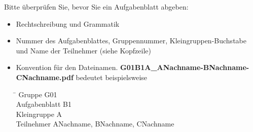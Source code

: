\documentclass[ngerman]{fbi-aufgabenblatt}
\begin{document}

Bitte überprüfen Sie, bevor Sie ein Aufgabenblatt abgeben:

\begin{itemize}
	\item Rechtschreibung und Grammatik
	\item Nummer des Aufgabenblattes, Gruppennummer, Kleingruppen-Buchstabe und Name der Teilnehmer (siehe Kopfzeile)
	\item Konvention für den Dateinamen.
	      \textbf{G01B1A\_ANachname-BNachname-CNachname.pdf} bedeutet beispielsweise
	      
	      \begin{tabbing}
				\hspace*{4cm}\=\hspace{3cm}\kill
	      Gruppe \> G01\\
				Aufgabenblatt \> B1 \\
				Kleingruppe \> A\\
				Teilnehmer \> ANachname, BNachname, CNachname
				\end{tabbing}

	
\end{itemize}


%
\end{document}
